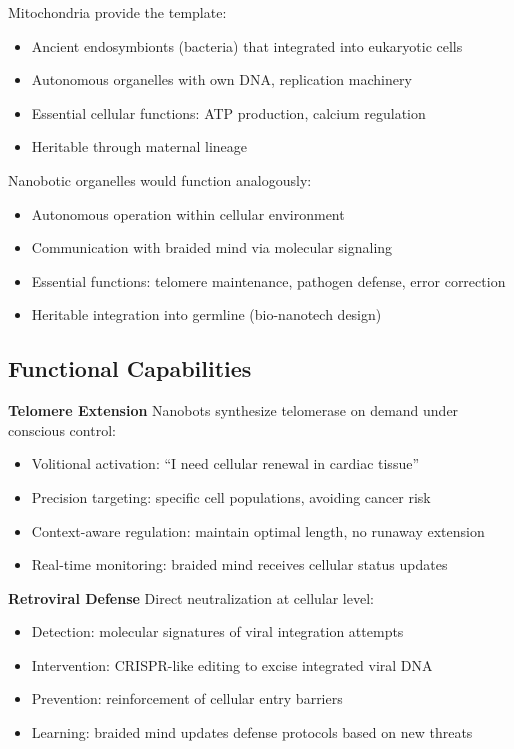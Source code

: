 \documentclass[reprint, amsmath, amssymb, aps, prd]{revtex4-2}
\begin{document}
Mitochondria provide the template:
\begin{itemize}
    \item Ancient endosymbionts (bacteria) that integrated into eukaryotic cells
    \item Autonomous organelles with own DNA, replication machinery
    \item Essential cellular functions: ATP production, calcium regulation
    \item Heritable through maternal lineage
\end{itemize}

Nanobotic organelles would function analogously:
\begin{itemize}
    \item Autonomous operation within cellular environment
    \item Communication with braided mind via molecular signaling
    \item Essential functions: telomere maintenance, pathogen defense, error correction
    \item Heritable integration into germline (bio-nanotech design)
\end{itemize}

\subsection{Functional Capabilities}

\textbf{Telomere Extension} Nanobots synthesize telomerase on demand under conscious control:
\begin{itemize}
    \item Volitional activation: ``I need cellular renewal in cardiac tissue''
    \item Precision targeting: specific cell populations, avoiding cancer risk
    \item Context-aware regulation: maintain optimal length, no runaway extension
    \item Real-time monitoring: braided mind receives cellular status updates
\end{itemize}

\textbf{Retroviral Defense} Direct neutralization at cellular level:
\begin{itemize}
    \item Detection: molecular signatures of viral integration attempts
    \item Intervention: CRISPR-like editing to excise integrated viral DNA
    \item Prevention: reinforcement of cellular entry barriers
    \item Learning: braided mind updates defense protocols based on new threats
\end{itemize}
\end{document}
